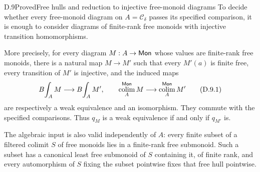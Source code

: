 \begin{claim}{D.9}{Proved}{Free hulls and reduction to injective free-monoid diagrams}
\label{D:finite-free-injective-reduction}
To decide whether every free-monoid diagram on
$A=\mathcal C_\delta$ passes its specified comparison, it is enough
to consider diagrams of finite-rank free monoids with injective
transition homomorphisms.

More precisely, for every diagram $M:A\to\mathsf{Mon}$ whose values are
finite-rank free monoids, there is a natural map $M\to M'$ such that
every $M'(a)$ is finite free, every transition of $M'$ is injective,
and the induced maps
\[
 B\!\int_A M\longrightarrow B\!\int_A M',
 \qquad
 \operatorname*{colim}_A^{\mathsf{Mon}}M\longrightarrow\operatorname*{colim}_A^{\mathsf{Mon}}M'
 \tag{D.9.1}
\]
are respectively a weak equivalence and an isomorphism. They commute
with the specified comparisons. Thus $q_M$ is a weak equivalence
if and only if $q_{M'}$ is.

The algebraic input is also valid independently of $A$: every finite
subset of a filtered colimit $S$ of free monoids lies in a finite-rank
free submonoid. Such a subset has a canonical least free submonoid
of $S$ containing it, of finite rank, and every automorphism of $S$
fixing the subset pointwise fixes that free hull pointwise.
\end{claim}
